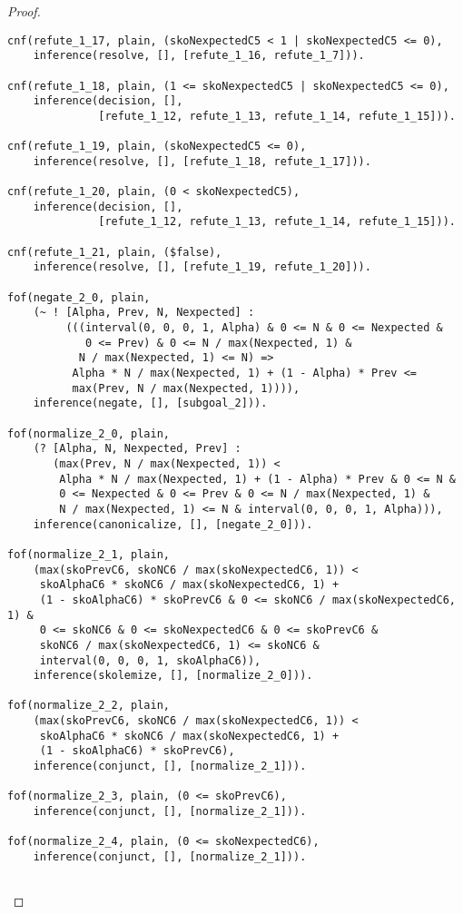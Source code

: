 \begin{proof}
\begin{verbatim}
cnf(refute_1_17, plain, (skoNexpectedC5 < 1 | skoNexpectedC5 <= 0),
    inference(resolve, [], [refute_1_16, refute_1_7])).

cnf(refute_1_18, plain, (1 <= skoNexpectedC5 | skoNexpectedC5 <= 0),
    inference(decision, [],
              [refute_1_12, refute_1_13, refute_1_14, refute_1_15])).

cnf(refute_1_19, plain, (skoNexpectedC5 <= 0),
    inference(resolve, [], [refute_1_18, refute_1_17])).

cnf(refute_1_20, plain, (0 < skoNexpectedC5),
    inference(decision, [],
              [refute_1_12, refute_1_13, refute_1_14, refute_1_15])).

cnf(refute_1_21, plain, ($false),
    inference(resolve, [], [refute_1_19, refute_1_20])).

fof(negate_2_0, plain,
    (~ ! [Alpha, Prev, N, Nexpected] :
         (((interval(0, 0, 0, 1, Alpha) & 0 <= N & 0 <= Nexpected &
            0 <= Prev) & 0 <= N / max(Nexpected, 1) &
           N / max(Nexpected, 1) <= N) =>
          Alpha * N / max(Nexpected, 1) + (1 - Alpha) * Prev <=
          max(Prev, N / max(Nexpected, 1)))),
    inference(negate, [], [subgoal_2])).

fof(normalize_2_0, plain,
    (? [Alpha, N, Nexpected, Prev] :
       (max(Prev, N / max(Nexpected, 1)) <
        Alpha * N / max(Nexpected, 1) + (1 - Alpha) * Prev & 0 <= N &
        0 <= Nexpected & 0 <= Prev & 0 <= N / max(Nexpected, 1) &
        N / max(Nexpected, 1) <= N & interval(0, 0, 0, 1, Alpha))),
    inference(canonicalize, [], [negate_2_0])).

fof(normalize_2_1, plain,
    (max(skoPrevC6, skoNC6 / max(skoNexpectedC6, 1)) <
     skoAlphaC6 * skoNC6 / max(skoNexpectedC6, 1) +
     (1 - skoAlphaC6) * skoPrevC6 & 0 <= skoNC6 / max(skoNexpectedC6, 1) &
     0 <= skoNC6 & 0 <= skoNexpectedC6 & 0 <= skoPrevC6 &
     skoNC6 / max(skoNexpectedC6, 1) <= skoNC6 &
     interval(0, 0, 0, 1, skoAlphaC6)),
    inference(skolemize, [], [normalize_2_0])).

fof(normalize_2_2, plain,
    (max(skoPrevC6, skoNC6 / max(skoNexpectedC6, 1)) <
     skoAlphaC6 * skoNC6 / max(skoNexpectedC6, 1) +
     (1 - skoAlphaC6) * skoPrevC6),
    inference(conjunct, [], [normalize_2_1])).

fof(normalize_2_3, plain, (0 <= skoPrevC6),
    inference(conjunct, [], [normalize_2_1])).

fof(normalize_2_4, plain, (0 <= skoNexpectedC6),
    inference(conjunct, [], [normalize_2_1])).


\end{verbatim}
\end{proof}
